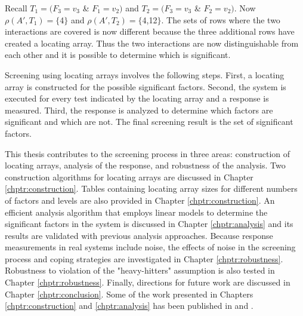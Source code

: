 Recall $T_1 = (F_3 = v_3$ \& $F_1 = v_2)$ and $T_2 = (F_3 = v_3$ \& $F_2 = v_2)$.
Now $\rho(A',T_1) = \{$4$\}$ and $\rho(A',T_2) = \{$4,12$\}$.
The sets of rows where the two interactions are covered is now different because the three additional rows have created a locating array.
Thus the two interactions are now distinguishable from each other and it is possible to determine which is significant.

Screening using locating arrays involves the following steps.
First, a locating array is constructed for the possible significant factors.
Second, the system is executed for every test indicated by the locating array and a response is measured.
Third, the response is analyzed to determine which factors are significant and which are not.
The final screening result is the set of significant factors.

This thesis contributes to the screening process in three areas: construction of locating arrays, analysis of the response, and robustness of the analysis.
Two construction algorithms for locating arrays are discussed in Chapter \ref{chptr:construction}.
Tables containing locating array sizes for different numbers of factors and levels are also provided in Chapter \ref{chptr:construction}.
An efficient analysis algorithm that employs linear models to determine the significant factors in the system is discussed in Chapter \ref{chptr:analysis} and its results are validated with previous analysis approaches.
Because response measurements in real systems include noise, the effects of noise in the screening process and coping strategies are investigated in Chapter \ref{chptr:robustness}.
Robustness to violation of the "heavy-hitters" assumption is also tested in Chapter  \ref{chptr:robustness}.
Finally, directions for future work are discussed in Chapter \ref{chptr:conclusion}.
Some of the work presented in Chapters \ref{chptr:construction} and \ref{chptr:analysis} has been published in \cite{seidelIWOCA} and \cite{seidelCNERT}.
